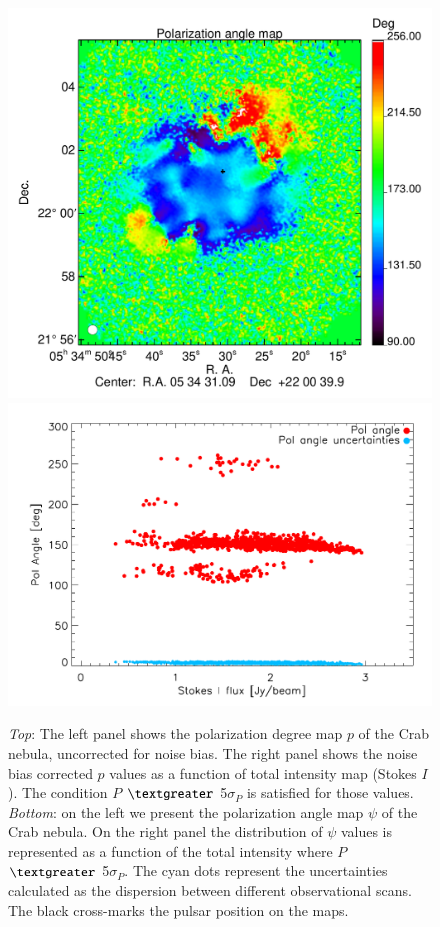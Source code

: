 \documentclass[twocolumn,traditabstract]{aa}
\begin{document}
\begin{figure}
\includegraphics[clip, angle=0, scale = 0.35]{figures/Crab_angle2_2mm.pdf}
\includegraphics[clip, angle=0, scale = 0.5]{figures/pol_angle_vs_I_2mm.pdf}
\caption{{\it Top}: The left panel shows the polarization
  degree map $p$ of the Crab nebula, uncorrected for noise bias. The right panel shows the noise bias
  corrected $p$ values as a function of total intensity map (Stokes $I$). The
  condition $P$ $\textgreater$ 5$\sigma_{P}$ is satisfied for those values. {\it
    Bottom}: on the left we present the polarization angle map $\psi$ of the
  Crab nebula. On the right panel the distribution of $\psi$ values is
  represented as a function of the total intensity where $P$ $\textgreater$
  5$\sigma_{P}$. The cyan dots represent the uncertainties calculated as the
  dispersion between different observational scans. The black cross-marks the pulsar position on the maps.}
\label{fig:pol_degree}
\end{figure}
\end{document}
